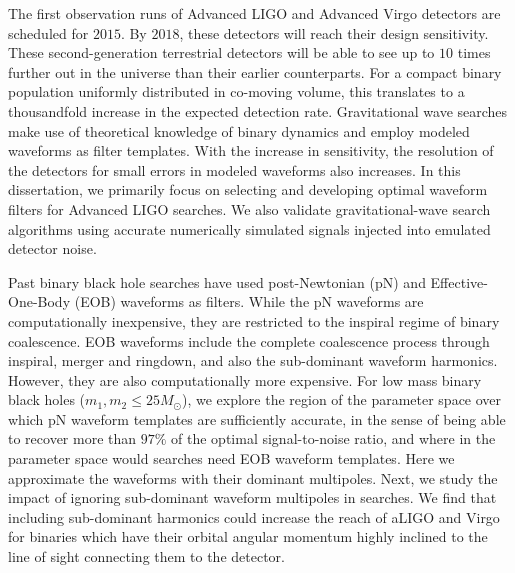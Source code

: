 

The first observation runs of Advanced LIGO and Advanced Virgo detectors 
are scheduled for $2015$. By $2018$, these detectors will reach 
their design sensitivity. These second-generation terrestrial detectors
will be able to see up to $10$ times further out in the universe 
than their earlier counterparts. For a compact binary population
uniformly distributed in co-moving volume, this translates to 
a thousandfold increase in the expected detection rate.
% 
Gravitational wave searches make use of theoretical knowledge of
binary dynamics and employ modeled waveforms as filter templates.
With the increase in sensitivity, the resolution of the detectors 
for small errors in modeled waveforms also increases. In this dissertation,
we primarily focus on selecting and developing optimal waveform filters
for Advanced LIGO searches. We also validate gravitational-wave 
search algorithms using accurate numerically simulated signals injected 
into emulated detector noise.

Past binary black hole searches have used post-Newtonian (pN) and 
Effective-One-Body (EOB) waveforms as filters. While the pN waveforms are 
computationally inexpensive, they are restricted to the inspiral
regime of binary coalescence. EOB waveforms include the complete
coalescence process through inspiral, merger and ringdown, and also
the sub-dominant waveform harmonics. However, they are also 
computationally more expensive. For low mass binary black holes 
($m_1,m_2\leq 25M_\odot$),
we explore the region of the parameter space over which pN waveform
templates are sufficiently accurate, in the sense of being able to 
recover more than $97\%$ of the optimal signal-to-noise ratio, 
and where in the parameter space would searches need EOB
waveform templates.
% 
Here we approximate the waveforms with their dominant multipoles. Next,
we study the impact of ignoring sub-dominant waveform multipoles in 
searches. We find that including sub-dominant harmonics could increase
the reach of aLIGO and Virgo for binaries which have their orbital
angular momentum highly inclined to the line of sight connecting them
to the detector.

